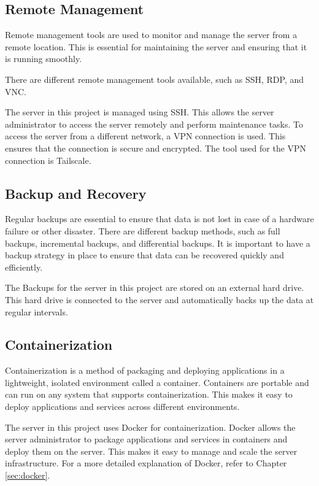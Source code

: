 \cite{networking}

\subsection{Remote Management}

Remote management tools are used to monitor and manage the server from a remote location.
This is essential for maintaining the server and ensuring that it is running smoothly.

There are different remote management tools available, such as SSH, RDP, and VNC. 

The server in this project is managed using SSH. This allows the server administrator to access the server remotely and perform maintenance tasks.
To access the server from a different network, a VPN connection is used. This ensures that the connection is secure and encrypted.
The tool used for the VPN connection is Tailscale.

\cite{remote_management}
\cite{Tailscale}

\subsection{Backup and Recovery}

Regular backups are essential to ensure that data is not lost in case of a hardware failure or other disaster.
There are different backup methods, such as full backups, incremental backups, and differential backups.
It is important to have a backup strategy in place to ensure that data can be recovered quickly and efficiently.

The Backups for the server in this project are stored on an external hard drive. This hard drive is connected to the server and automatically backs up the data at regular intervals.


\subsection{Containerization}

Containerization is a method of packaging and deploying applications in a lightweight, isolated environment called a container.
Containers are portable and can run on any system that supports containerization.
This makes it easy to deploy applications and services across different environments.

The server in this project uses Docker for containerization. Docker allows the server administrator to package applications and services in containers and deploy them on the server.
This makes it easy to manage and scale the server infrastructure. For a more detailed explanation of Docker, refer to Chapter \ref{sec:docker}.

